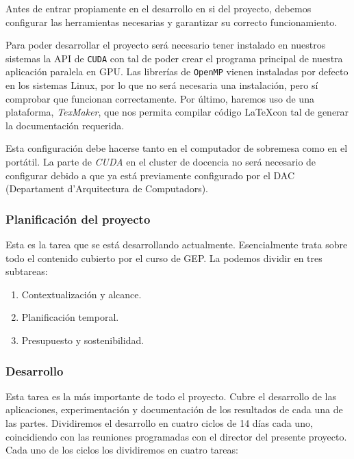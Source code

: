 \documentclass[titlepage,12pt]{report}
\begin{document}
Antes de entrar propiamente en el desarrollo en si del proyecto, debemos configurar las herramientas necesarias y garantizar su correcto funcionamiento.

Para poder desarrollar el proyecto será necesario tener instalado en nuestros sistemas la API de \texttt{CUDA} con tal de poder crear el programa principal de nuestra aplicación paralela en GPU. Las librerías de \texttt{OpenMP} vienen instaladas por defecto en los sistemas Linux, por lo que no será necesaria una instalación, pero sí comprobar que funcionan correctamente. Por último, haremos uso de una plataforma, \textit{TexMaker}, que nos permita compilar código \LaTeX con tal de generar la documentación requerida.

Esta configuración debe hacerse tanto en el computador de sobremesa como en el portátil. La parte de \textit{CUDA} en el cluster de docencia no será necesario de configurar debido a que ya está previamente configurado por el DAC (Departament d'Arquitectura de Computadors). 

\subsubsection{Planificación del proyecto}

Esta es la tarea que se está desarrollando actualmente. Esencialmente trata sobre todo el contenido cubierto por el curso de GEP. La podemos dividir en tres subtareas:

\begin{enumerate}
		\item Contextualización y alcance.
		\item Planificación temporal.
		\item Presupuesto y sostenibilidad.
\end{enumerate}

\subsubsection{Desarrollo}

Esta tarea es la más importante de todo el proyecto. Cubre el desarrollo de las aplicaciones, experimentación y documentación de los resultados de cada una de las partes. Dividiremos el desarrollo en cuatro ciclos de 14 días cada uno, coincidiendo con las reuniones programadas con el director del presente proyecto. Cada uno de los ciclos los dividiremos en cuatro tareas:
\end{document}
